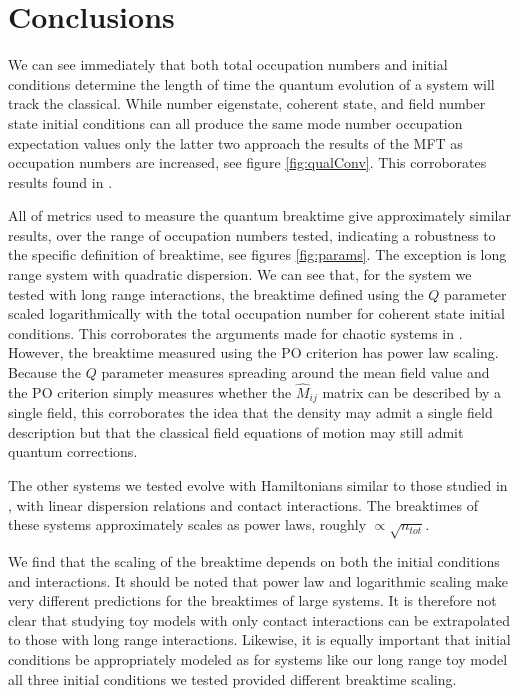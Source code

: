 \documentclass[aps,prd,twocolumn,superscriptaddress]{revtex4-1}
\begin{document}
\section{Conclusions} \label{sec:conclusion}

We can see immediately that both total occupation numbers and initial conditions determine the length of time the quantum evolution of a system will track the classical. While number eigenstate, coherent state, and field number state initial conditions can all produce the same mode number occupation expectation values only the latter two approach the results of the MFT as occupation numbers are increased, see figure \ref{fig:qualConv}. This corroborates results found in \cite{Sikivie2017, Hertzberg2016, chakrabarty2021}. 

All of metrics used to measure the quantum breaktime give approximately similar results, over the range of occupation numbers tested, indicating a robustness to the specific definition of breaktime, see figures \ref{fig:params}. The exception is long range system with quadratic dispersion. We can see that, for the system we tested with long range interactions, the breaktime defined using the $Q$ parameter scaled logarithmically with the total occupation number for coherent state initial conditions. This corroborates the arguments made for chaotic systems in \cite{Hertzberg2016,Albrecht2014}. However, the breaktime measured using the PO criterion has power law scaling. Because the $Q$ parameter measures spreading around the mean field value and the PO criterion simply measures whether the $\hat M_{ij}$ matrix can be described by a single field, this corroborates the idea that the density may admit a single field description but that the classical field equations of motion may still admit quantum corrections.

The other systems we tested evolve with Hamiltonians similar to those studied in \cite{Hertzberg2016, Sikivie2017}, with linear dispersion relations and contact interactions. The breaktimes of these systems approximately scales as power laws, roughly $\propto \sqrt{n_{tot}}$. 

We find that the scaling of the breaktime depends on both the initial conditions and interactions. It should be noted that power law and logarithmic scaling make very different predictions for the breaktimes of large systems. It is therefore not clear that studying toy models with only contact interactions can be extrapolated to those with long range interactions. Likewise, it is equally important that initial conditions be appropriately modeled as for systems like our long range toy model all three initial conditions we tested provided different breaktime scaling. 
\end{document}
